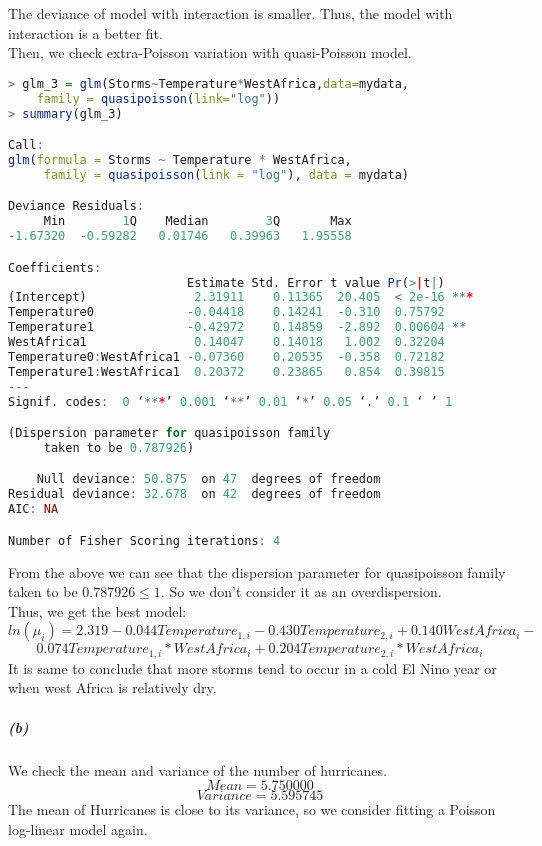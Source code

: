 \documentclass[12pt,a4paper]{article}
\begin{document}
The deviance of model with interaction is smaller. Thus, the model with interaction is a better ﬁt.\\
\newline
Then, we check extra-Poisson variation with quasi-Poisson model.
\begin{lstlisting}[language = R]
> glm_3 = glm(Storms~Temperature*WestAfrica,data=mydata,
    family = quasipoisson(link="log")) 
> summary(glm_3) 

Call:
glm(formula = Storms ~ Temperature * WestAfrica, 
     family = quasipoisson(link = "log"), data = mydata)

Deviance Residuals: 
     Min        1Q    Median        3Q       Max  
-1.67320  -0.59282   0.01746   0.39963   1.95558  

Coefficients:
                         Estimate Std. Error t value Pr(>|t|)    
(Intercept)               2.31911    0.11365  20.405  < 2e-16 ***
Temperature0             -0.04418    0.14241  -0.310  0.75792    
Temperature1             -0.42972    0.14859  -2.892  0.00604 ** 
WestAfrica1               0.14047    0.14018   1.002  0.32204    
Temperature0:WestAfrica1 -0.07360    0.20535  -0.358  0.72182    
Temperature1:WestAfrica1  0.20372    0.23865   0.854  0.39815    
---
Signif. codes:  0 ‘***’ 0.001 ‘**’ 0.01 ‘*’ 0.05 ‘.’ 0.1 ‘ ’ 1

(Dispersion parameter for quasipoisson family 
     taken to be 0.787926)

    Null deviance: 50.875  on 47  degrees of freedom
Residual deviance: 32.678  on 42  degrees of freedom
AIC: NA

Number of Fisher Scoring iterations: 4
\end{lstlisting} 
From the above we can see that the dispersion parameter for quasipoisson family taken to be $0.787926 ≤ 1$. So we don’t consider it as an overdispersion.\\
\newline
Thus, we get the best model:
\[ln(\mu_i) = 2.319 - 0.044Temperature_{1 , i} - 0.430Temperature_{2 , i} + 0.140WestAfrica_i -\]
\[0.074Temperature_{1 , i} * WestAfrica_i + 0.204Temperature_{2 , i} * WestAfrica_i\]
It is same to conclude that more storms tend to occur in a cold El Nino year or when west Africa is relatively dry.
\subparagraph{(b)}
We check the mean and variance of the number of hurricanes.
\[Mean = 5.750000 \]
\[Variance =  5.595745\]
The mean of Hurricanes is close to its variance, so we consider ﬁtting a Poisson log-linear model again.\\
\end{document}

